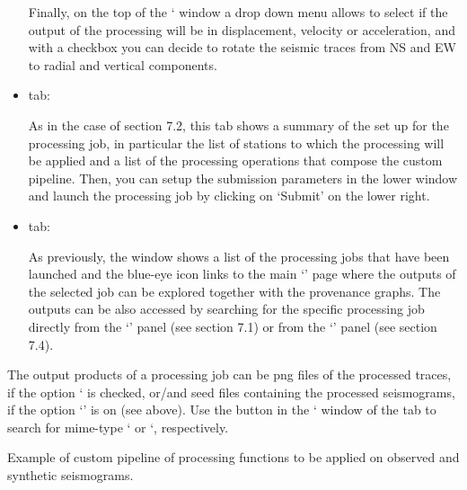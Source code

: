 \documentclass[english]{book}
\begin{document}
\begin{itemize}
Finally, on the top of the ‘ window a drop down menu
allows to select if the output of the processing will be in
displacement, velocity or acceleration, and with a checkbox you can
decide to rotate the seismic traces from NS and EW to radial and
vertical components.

\item {} 
 tab:

As in the case of section 7.2, this tab shows a summary of the set up
for the processing job, in particular the list of stations to which the
processing will be applied and a list of the processing operations that
compose the custom pipeline. Then, you can setup the submission
parameters in the lower window and launch the processing job by clicking
on ‘Submit’ on the lower right.

\item {} 
 tab:

As previously, the window shows a list of the processing jobs that have
been launched and the blue-eye icon links to the main ‘’
page where the outputs of the selected job can be explored together with
the provenance graphs. The outputs can be also accessed by searching for
the specific processing job directly from the ‘’ panel (see
section 7.1) or from the ‘’ panel (see section 7.4).

\end{itemize}

The output products of a processing job can be png files of the
processed traces, if the option ‘ is checked, or/and seed files
containing the processed seismograms, if the option ‘’ is on
(see above). Use the  button in the ‘ window
of the  tab to search for mime-type ‘ or
‘, respectively.


 Example of custom pipeline of processing functions to
be applied on observed and synthetic seismograms.
\end{document}
